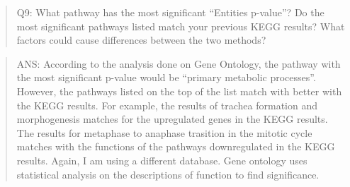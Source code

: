 \documentclass[
]{article}
\begin{document}
\begin{quote}
Q9: What pathway has the most significant ``Entities p-value''? Do the
most significant pathways listed match your previous KEGG results? What
factors could cause differences between the two methods?
\end{quote}

\begin{quote}
ANS: According to the analysis done on Gene Ontology, the pathway with
the most significant p-value would be ``primary metabolic processes''.
However, the pathways listed on the top of the list match with better
with the KEGG results. For example, the results of trachea formation and
morphogenesis matches for the upregulated genes in the KEGG results. The
results for metaphase to anaphase trasition in the mitotic cycle matches
with the functions of the pathways downregulated in the KEGG results.
Again, I am using a different database. Gene ontology uses statistical
analysis on the descriptions of function to find significance.
\end{quote}
\end{document}
